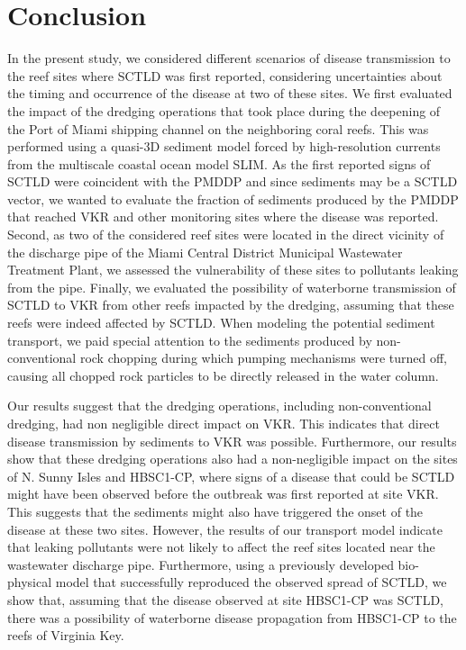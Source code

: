 \documentclass[preprint,12pt,authoryear]{elsarticle}
\begin{document}
\section{Conclusion}

In the present study, we considered different scenarios of disease transmission to the reef sites where SCTLD was first reported, considering uncertainties about the timing and occurrence of the disease at two of these sites. We first evaluated the impact of the dredging operations that took place during the deepening of the Port of Miami shipping channel on the neighboring coral reefs. This was performed using a quasi-3D sediment model forced by high-resolution currents from the multiscale coastal ocean model SLIM. As the first reported signs of SCTLD were coincident with the PMDDP and since sediments may be a SCTLD vector, we wanted to evaluate the fraction of sediments produced by the PMDDP that reached VKR and other monitoring sites where the disease was reported. Second, as two of the considered reef sites were located in the direct vicinity of the discharge pipe of the Miami Central District Municipal Wastewater Treatment Plant, we assessed the vulnerability of these sites to pollutants leaking from the pipe. Finally, we evaluated the possibility of waterborne transmission of SCTLD to VKR from other reefs impacted by the dredging, assuming that these reefs were indeed affected by SCTLD. When modeling the potential sediment transport, we paid special attention to the sediments produced by non-conventional rock chopping during which pumping mechanisms were turned off, causing all chopped rock particles to be directly released in the water column.

Our results suggest that the dredging operations, including non-conventional dredging, had non negligible direct impact on VKR. This indicates that direct disease transmission by sediments to VKR was possible. Furthermore, our results show that these dredging operations also had a non-negligible impact on the sites of N. Sunny Isles and HBSC1-CP, where signs of a disease that could be SCTLD might have been observed before the outbreak was first reported at site VKR. This suggests that the sediments might also have triggered the onset of the disease at these two sites. However, the results of our transport model indicate that leaking pollutants were not likely to affect the reef sites located near the wastewater discharge pipe. Furthermore, using a previously developed bio-physical model that successfully reproduced the observed spread of SCTLD, we show that, assuming that the disease observed at site HBSC1-CP was SCTLD, there was a possibility of waterborne disease propagation from HBSC1-CP to the reefs of Virginia Key.
\end{document}
